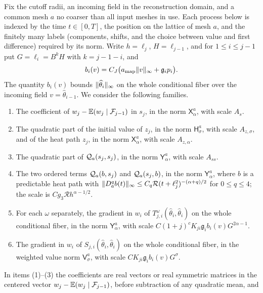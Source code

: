\begin{lemma}\label{ch30:lem:component-metric-suppliers}
Fix the cutoff radii, an incoming field in the reconstruction domain, and a common mesh $a$ no coarser than all input meshes in use. Each process below is indexed by the time $t\in[0,T]$, the position on the lattice of mesh $a$, and the finitely many labels (components, shifts, and the choice between value and first difference) required by its norm. Write $h=\ell_j$, $H=\ell_{j-1}$, and for $1\le i\le j-1$ put $G=\ell_i=B^kH$ with $k=j-1-i$, and
\[
 b_i(v)=C_J\bigl(a_{\mathrm{map}}\lVert v\rVert_\infty+\mathfrak g_ip_i\bigr).
\]
The quantity $b_i(v)$ bounds $\lVert \widehat\theta_i\rVert_\infty$ on the whole conditional fiber over the incoming field $v=\widehat\theta_{i-1}$. We consider the following families.
\begin{enumerate}
\item The coefficient of $w_j-\mathbb E(w_j\mid\mathcal F_{j-1})$ in $s_j$, in the norm $\mathsf X_\alpha^a$, with scale $A_s$.
\item The quadratic part of the initial value of $z_j$, in the norm $\mathsf H_\sigma^a$, with scale $A_{z,\sigma}$, and of the heat path $z_j$, in the norm $\mathsf X_\alpha^a$, with scale $A_{z,\alpha}$.
\item The quadratic part of $\mathcal Q_{a}(s_j,s_j)$, in the norm $\mathsf Y_\alpha^a$, with scale $A_{ss}$.
\item The two ordered terms $\mathcal Q_{a}(b,s_j)$ and $\mathcal Q_{a}(s_j,b)$, in the norm $\mathsf Y_\alpha^a$, where $b$ is a predictable heat path with $\lVert D_a^qb(t)\rVert_\infty\le C_q\mathcal R(t+\ell_j^2)^{-(\alpha+q)/2}$ for $0\le q\le4$; the scale is $Cg_3\mathcal Rh^{\alpha-1/2}$.
\item For each $\omega$ separately, the gradient in $w_i$ of $T^\omega_{j,i}(\widehat\theta_i,\widehat\theta_i)$ on the whole conditional fiber, in the norm $\mathsf Y_\alpha^a$, with scale $C(1+j)^cK_{ji}\mathfrak g_ib_i(v)G^{2\alpha-1}$.
\item The gradient in $w_i$ of $S_{j,i}(\widehat\theta_i,\widehat\theta_i)$ on the whole conditional fiber, in the weighted value norm $\mathsf V_\sigma^a$, with scale $CK_{ji}\mathfrak g_ib_i(v)G^\sigma$.
\end{enumerate}
In items (1)--(3) the coefficients are real vectors or real symmetric matrices in the centered vector $w_j-\mathbb E(w_j\mid\mathcal F_{j-1})$, before subtraction of any quadratic mean, and
\begin{equation}\label{ch30:eq:local-scales}
 \begin{gathered}

\end{gathered}
\end{equation}
\end{lemma}
